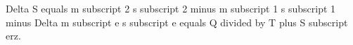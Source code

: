 Delta S equals m subscript 2 s subscript 2 minus m subscript 1 s subscript 1 minus Delta m subscript e s subscript e equals Q divided by T plus S subscript erz.